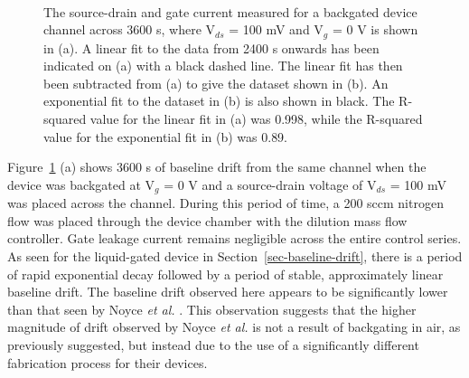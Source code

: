 \documentclass[
  a4paper,
]{scrbook}
\begin{document}
\begin{figure}
\begin{minipage}[t]{0.70\linewidth}
{}

\end{minipage}%
%
\begin{minipage}[t]{0.15\linewidth}

{\centering 

~

}

\end{minipage}%

\caption{\label{fig-bg-baseline-drift}The source-drain and gate current
measured for a backgated device channel across 3600 s, where V\(_{ds}\)
= 100 mV and V\(_g\) = 0 V is shown in (a). A linear fit to the data
from 2400 s onwards has been indicated on (a) with a black dashed line.
The linear fit has then been subtracted from (a) to give the dataset
shown in (b). An exponential fit to the dataset in (b) is also shown in
black. The R-squared value for the linear fit in (a) was 0.998, while
the R-squared value for the exponential fit in (b) was 0.89.}

\end{figure}

Figure~\ref{fig-bg-baseline-drift} (a) shows 3600 s of baseline drift
from the same channel when the device was backgated at V\(_g\) = 0 V and
a source-drain voltage of V\(_{ds}\) = 100 mV was placed across the
channel. During this period of time, a 200 sccm nitrogen flow was placed
through the device chamber with the dilution mass flow controller. Gate
leakage current remains negligible across the entire control series. As
seen for the liquid-gated device in Section~\ref{sec-baseline-drift},
there is a period of rapid exponential decay followed by a period of
stable, approximately linear baseline drift. The baseline drift observed
here appears to be significantly lower than that seen by Noyce \emph{et
al.} \autocite{Noyce2019}. This observation suggests that the higher
magnitude of drift observed by Noyce \emph{et al.} is not a result of
backgating in air, as previously suggested, but instead due to the use
of a significantly different fabrication process for their devices.
\end{document}

